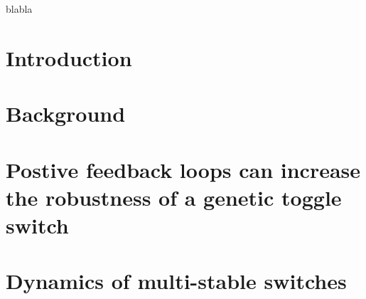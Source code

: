 \documentclass[]{phdthesis}
\begin{document}
\begin{acknowledgements}
blabla
\end{acknowledgements}


\mainmatter*
\chapter{Introduction}
\label{ch:Intro}


\mainmatter*
\chapter{Background}
\label{ch:backg}



%

\mainmatter*
\chapter{Postive feedback loops can increase the robustness of a genetic toggle switch}
\label{ch:abcsysbio}



\mainmatter*
 
\chapter{Dynamics of multi-stable switches}
\label{ch:SF}

%
%
%
%
%
\end{document}
